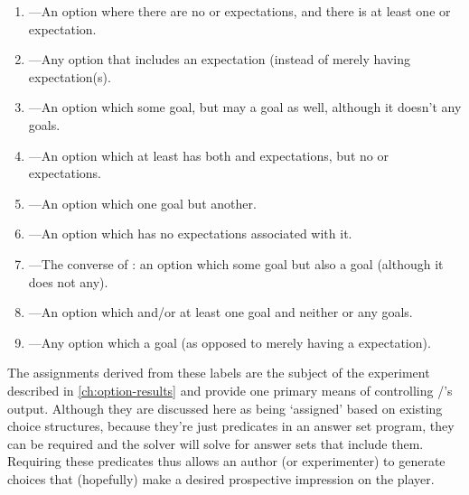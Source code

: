 \begin{enumerate}[leftmargin=1.4em]
\begin{enumerate}
  \item {}---An option where there are no  or  expectations, and there is at least one  or  expectation.
  \item {}---Any  option that includes an  expectation (instead of merely having  expectation(s).
  \item {}---An option which  some goal, but may  a goal as well, although it doesn't  any goals.
  \item {}---An option which at least has both  and  expectations, but no  or  expectations.
  \item {}---An option which  one goal but  another. 
  \item {}---An option which has no expectations associated with it.
  \item {}---The converse of : an option which  some goal but also  a goal (although it does not  any). 
  \item {}---An option which  and/or  at least one goal and neither  or  any goals.
  \item {}---Any  option which  a goal (as opposed to merely having a  expectation). 
\end{enumerate}



The  assignments derived from these  labels are the subject of the experiment described in \cref{ch:option-results} and provide one primary means of controlling \dunyazad/'s output.
%
Although they are discussed here as being `assigned' based on existing choice structures, because they're just predicates in an answer set program, they can be required and the solver will solve for answer sets that include them.
%
Requiring these  predicates thus allows an author (or experimenter) to generate choices that (hopefully) make a desired prospective impression on the player.

\begin{figure}[!b]
\centering
{}
\end{figure}
\end{enumerate}
